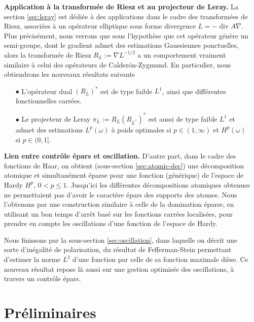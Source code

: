 \documentclass[11pt]{amsart}
\DeclareMathOperator{\dive}{div}
\begin{document}
\medskip

\large{ \bf Application \`a la transform\'ee de Riesz et au projecteur de Leray.}
La section \ref{sec:leray} est d\'edi\'ee \`a des applications dans le cadre des transform\'ees de Riesz, associ\'ees \`a un op\'erateur elliptique sous forme divergence $L=-\dive A\nabla$. Plus pr\'ecis\'ement, nous verrons que sous l'hypoth\`ese que cet op\'erateur g\'en\`ere un semi-groupe, dont le gradient admet des estimations Gaussiennes ponctuelles, alors la transform\'ee de Riesz $R_L:=\nabla L^{-1/2}$  a un comportement vraiment similaire \`a celui des op\'erateurs de Calder\'on-Zygmund. En particulier, nous obtiendrons les nouveaux r\'esultats suivants
\begin{itemize}
\item[$\bullet$] L'op\'erateur dual $(R_L)^*$ est de type faible $L^1$, ainsi que diff\'erentes fonctionnelles carr\'ees.
\item[$\bullet$] Le projecteur de Leray $\pi_L:=R_L (R_{L^*})^*$ est aussi de type faible $L^1$ et admet des estimations $L^p(\omega)$ \`a poids optimales si $p\in(1,\infty)$ et $H^p(\omega)$ si $p\in(0,1]$. 
\end{itemize}

\medskip

\large{ \bf Lien entre contr\^ole \'epars et oscillation.}
D'autre part, dans le cadre des fonctions de Haar, on obtient (sous-section \ref{sec:atomic-dec}) une d\'ecomposition atomique et simultan\'ement \'eparse pour une fonction (g\'en\'erique) de l'espace de Hardy $H^p$, $0<p \leq 1$. Jusqu'ici les diff\'erentes d\'ecompositions atomiques obtenues ne permettaient pas d'avoir le caract\`ere \'epars des supports des atomes. Nous l'obtenons par une construction similaire \`a celle de la domination \'eparse, en utilisant un bon temps d'arr\^et bas\'e sur les fonctions carr\'ees localis\'ees, pour prendre en compte les oscillations d'une fonction de l'espace de Hardy.

Nous finissons par la sous-section \ref{sec:oscillation}, dans laquelle on d\'ecrit une sorte d'in\'egalit\'e de polarisation, du r\'esultat de Fefferman-Stein permettant d'estimer la norme $L^2$ d'une fonction par celle de sa fonction maximale di\`ese. Ce nouveau r\'esultat repose l\`a aussi sur une gestion optimis\'ee des oscillations, \`a travers un contr\^ole \'epars.



\section{Pr\'eliminaires}
\end{document}
